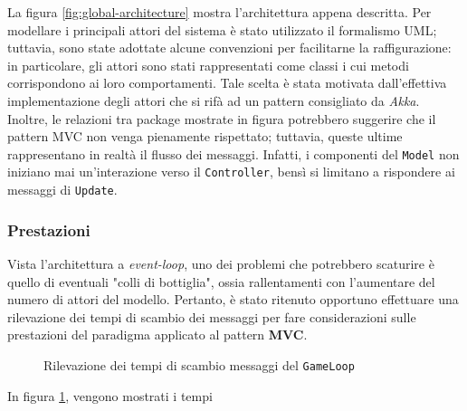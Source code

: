 La figura \ref{fig:global-architecture} mostra l'architettura appena descritta. Per modellare i principali attori del
sistema è stato utilizzato il formalismo UML; tuttavia, sono state adottate alcune convenzioni per facilitarne la
raffigurazione: in particolare, gli attori sono stati rappresentati come classi i cui metodi corrispondono ai loro
comportamenti. Tale scelta è stata motivata dall'effettiva implementazione degli attori che si rifà ad un pattern
consigliato da \textit{Akka}.
Inoltre, le relazioni tra package mostrate in figura potrebbero suggerire che il pattern MVC non venga pienamente
rispettato; tuttavia, queste ultime rappresentano in realtà il flusso dei messaggi. Infatti, i componenti del
\texttt{Model} non iniziano mai un'interazione verso il \texttt{Controller}, bensì si limitano a rispondere ai messaggi
di \texttt{Update}.

\subsubsection{Prestazioni}
Vista l'architettura a \textit{event-loop}, uno dei problemi che potrebbero scaturire è quello di eventuali "colli di
bottiglia", ossia rallentamenti con l'aumentare del numero di attori del modello. Pertanto, è stato ritenuto opportuno
effettuare una rilevazione dei tempi di scambio dei messaggi per fare considerazioni sulle prestazioni del paradigma
applicato al pattern \textbf{MVC}.

\begin{figure}[H]
    \centering
    \label{plot:performance-evaluation}
    \caption{Rilevazione dei tempi di scambio messaggi del \texttt{GameLoop}}
\end{figure}

In figura \ref{plot:performance-evaluation}, vengono mostrati i tempi


